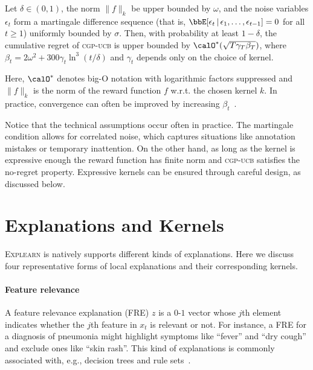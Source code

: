 \documentclass[letterpaper]{article} %
\newcommand{\explearn}{\textsc{Explearn}\xspace}
\newcommand{\cgpucb}{\textsc{cgp-ucb}\xspace}
\begin{document}
\begin{theorem}
    Let $\delta \in (0, 1)$, the norm $\|f\|_k$ be upper bounded by $\omega$, and the noise variables $\epsilon_t$ form a martingale difference sequence (that is, $\bbE[\epsilon_t \,|\, \epsilon_1, \ldots, \epsilon_{t-1}] = 0$ for all $t \ge 1$) uniformly bounded by $\sigma$.  Then, with probability at least $1 - \delta$, the cumulative regret of \cgpucb is upper bounded by $\calO^*(\sqrt{T \gamma_T \beta_T})$, where $\beta_t = 2\omega^2 + 300\gamma_t \ln^3(t / \delta)$ and $\gamma_t$ depends only on the choice of kernel.
    \label{thm:bound}
\end{theorem}

\noindent Here, $\calO^*$ denotes big-O notation with logarithmic factors suppressed and $\|f\|_k$ is the norm of the reward function $f$ w.r.t. the chosen kernel $k$.  In practice, convergence can often be improved by increasing $\beta_t$~\cite{krause2011contextual}.

Notice that the technical assumptions occur often in practice.  The martingale condition allows for correlated noise, which captures situations like annotation mistakes or temporary inattention.  On the other hand, as long as the kernel is expressive enough the reward function has finite norm and \cgpucb satisfies the no-regret property. Expressive kernels can be ensured through careful design, as discussed below.


\section{Explanations and Kernels}
\label{ssec:discussion}

\explearn is natively supports different kinds of explanations.  Here we discuss four representative forms of local explanations and their corresponding kernels.

\paragraph{Feature relevance}

A feature relevance explanation (FRE) $z$ is a $0$-$1$ vector whose $j$th element indicates whether the $j$th feature in $x_t$ is relevant or not.  For instance, a FRE for a diagnosis of pneumonia might highlight symptoms like ``fever'' and ``dry cough'' and exclude ones like ``skin rash''.  This kind of explanations is commonly associated with, e.g., decision trees and rule sets~\cite{freitas2014comprehensible,lakkaraju2016interpretable}.
\end{document}

